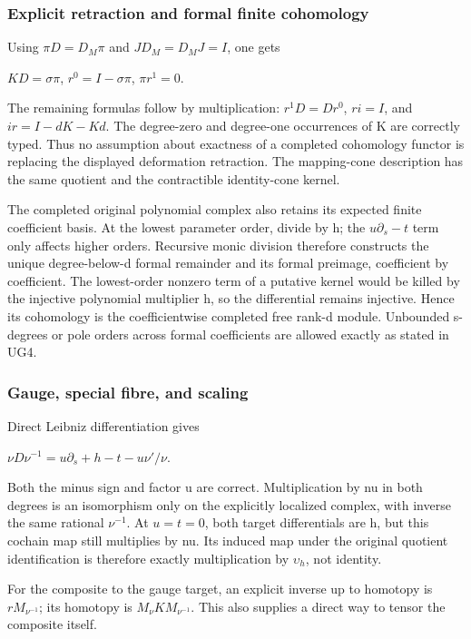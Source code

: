 \documentclass{article}
\begin{document}
\subsubsection{Explicit retraction and formal finite cohomology}\label{endpoint-f1_unit_gauge_review--explicit-retraction-and-formal-finite-cohomology}

Using \(\pi D=D_M\pi\) and \(J D_M=D_M J=I\), one gets

\(KD=\sigma\pi\), \(r^0=I-\sigma\pi\), \(\pi r^1=0\).

The remaining formulas follow by multiplication: \(r^1D=Dr^0\), \(ri=I\), and \(ir=I-dK-Kd\). The degree-zero and degree-one occurrences of K are correctly typed. Thus no assumption about exactness of a completed cohomology functor is replacing the displayed deformation retraction. The mapping-cone description has the same quotient and the contractible identity-cone kernel.

The completed original polynomial complex also retains its expected finite coefficient basis. At the lowest parameter order, divide by h; the \(u\partial_s-t\) term only affects higher orders. Recursive monic division therefore constructs the unique degree-below-d formal remainder and its formal preimage, coefficient by coefficient. The lowest-order nonzero term of a putative kernel would be killed by the injective polynomial multiplier h, so the differential remains injective. Hence its cohomology is the coefficientwise completed free rank-d module. Unbounded s-degrees or pole orders across formal coefficients are allowed exactly as stated in UG4.

\subsubsection{Gauge, special fibre, and scaling}\label{endpoint-f1_unit_gauge_review--gauge-special-fibre-and-scaling}

Direct Leibniz differentiation gives

\(\nu D\nu^{-1}=u\partial_s+h-t-u\nu'/\nu\).

Both the minus sign and factor u are correct. Multiplication by nu in both degrees is an isomorphism only on the explicitly localized complex, with inverse the same rational \(\nu^{-1}\). At \(u=t=0\), both target differentials are h, but this cochain map still multiplies by nu. Its induced map under the original quotient identification is therefore exactly multiplication by \(\upsilon_h\), not identity.

For the composite to the gauge target, an explicit inverse up to homotopy is \(r M_{\nu^{-1}}\); its homotopy is \(M_\nu K M_{\nu^{-1}}\). This also supplies a direct way to tensor the composite itself.
\end{document}
